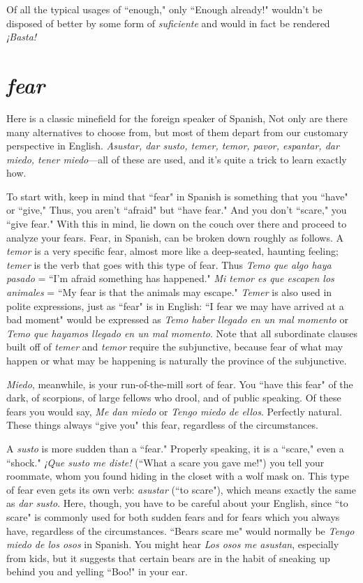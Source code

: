 Of all the typical usages of ``enough," only ``Enough already!"
wouldn't be disposed of better by some form of \emph{suficiente} and would in
fact be rendered \emph{¡Basta!}

\section{\emph{fear}}

Here is a classic minefield for the foreign speaker of Spanish,
Not only are there many alternatives to choose from, but most of them
depart from our customary perspective in English. \emph{Asustar, dar susto,
	temer, temor, pavor, espantar, dar miedo, tener miedo}---all of these
are used, and it's quite a trick to learn exactly how.

To start with, keep in mind that ``fear" in Spanish is something that you ``have" or ``give," Thus, you aren't ``afraid" but ``have
fear." And you don't ``scare," you ``give fear." With this in mind, lie
down on the couch over there and proceed to analyze your fears. Fear,
in Spanish, can be broken down roughly as follows. A \emph{temor} is a very
specific fear, almost more like a deep-seated, haunting feeling; \emph{temer}
is the verb that goes with this type of fear. Thus \emph{Temo que algo haya
	pasado} = ``I'm afraid something has happened." \emph{Mi temor es que escapen los animales} = ``My fear is that the animals may escape." \emph{Temer}
is also used in polite expressions, just as ``fear" is in English: ``I fear we
may have arrived at a bad moment" would be expressed as \emph{Temo haber
	llegado en un mal momento} or \emph{Temo que hayamos llegado en un mal
	momento}. Note that all subordinate clauses built off of \emph{temer} and \emph{temor} require the subjunctive, because fear of what may happen or what
may be happening is naturally the province of the subjunctive.

\emph{Miedo}, meanwhile, is your run-of-the-mill sort of fear. You
``have this fear" of the dark, of scorpions, of large fellows who drool,
and of public speaking. Of these fears you would say, \emph{Me dan miedo}
or \emph{Tengo miedo de ellos}. Perfectly natural. These things always ``give
you" this fear, regardless of the circumstances.

A \emph{susto} is more sudden than a ``fear." Properly speaking, it is a
``scare," even a ``shock." \emph{¡Que susto me diste!} (``What a scare you gave
me!") you tell your roommate, whom you found hiding in the closet
with a wolf mask on. This type of fear even gets its own verb: \emph{asustar}
(``to scare"), which means exactly the same as \emph{dar susto}. Here, though,
you have to be careful about your English, since ``to scare" is commonly used for both sudden fears and for fears which you always have,
regardless of the circumstances. ``Bears scare me" would normally
be \emph{Tengo miedo de los osos} in Spanish. You might hear \emph{Los osos me
	asustan}, especially from kids, but it suggests that certain bears are in
the habit of sneaking up behind you and yelling ``Boo!" in your ear.


